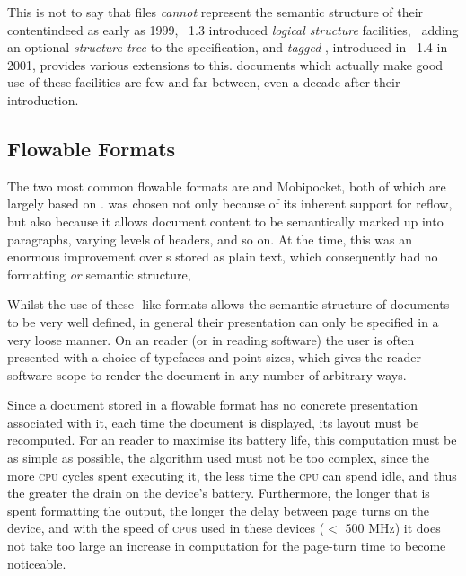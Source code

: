 This is not to say that \pdf{} files \emph{cannot} represent the semantic structure of their content\ed indeed as early as 1999, \pdf{}~1.3 introduced \emph{logical structure} facilities,~\cite{Adobe2001} adding an optional \emph{structure tree} to the \pdf{} specification, and \emph{tagged \pdf{}}, introduced in \pdf{}~1.4 in 2001, provides various extensions to this. \pdf{} documents which actually make good use of these facilities are few and far between, even a decade after their introduction.



\subsection{Flowable Formats}
\label{sec:flowableformats}
The two most common flowable \ebook{} formats are \epub{} and Mobipocket, both of which are largely based on \html{}. \html{} was chosen not only because of its inherent support for reflow, but also because it allows document content to be semantically marked up into paragraphs, varying levels of headers, and so on. At the time, this was an enormous improvement over \ebook{}s stored as plain text, which consequently had no formatting \emph{or} semantic structure, 

Whilst the use of these \html{}-like formats allows the semantic structure of documents to be very well defined, in general their presentation can only be specified in a very loose manner. On an \ebook{} reader (or in \ebook{} reading software) the user is often presented with a choice of typefaces and point sizes, which gives the reader software scope to render the document in any number of arbitrary ways.

Since a document stored in a flowable format has no concrete presentation associated with it, each time the document is displayed, its layout must be recomputed. For an \ebook{} reader to maximise its battery life, this computation must be as simple as possible, \ie{} the algorithm used must not be too complex, since the more \textsc{cpu} cycles spent executing it, the less time the \textsc{cpu} can spend idle, and thus the greater the drain on the device's battery. Furthermore, the longer that is spent formatting the output, the longer the delay between page turns on the device, and with the speed of \textsc{cpu}s used in these devices ($<$ 500 \textsc{MHz}) it does not take too large an increase in computation for the page-turn time to become noticeable.



